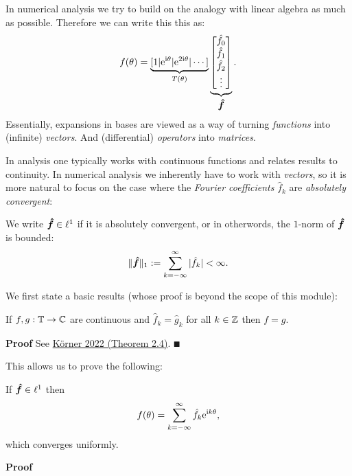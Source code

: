 In numerical analysis we try to build on the analogy with linear algebra as much as possible. Therefore we  can write this this as:
\[
f(\theta) = \underbrace{[1 | {\rm e}^{{\rm i}\theta} | {\rm e}^{2{\rm i}\theta} | \cdots]}_{T(\theta)}
\underbrace{\begin{bmatrix} \hat f_0 \\ \hat f_1 \\ \hat f_2 \\ \vdots \end{bmatrix}}_{{\mbox{\boldmath$\hat f$\unboldmath}}}.
\]
Essentially, expansions in bases are viewed as a way of turning \emph{functions} into (infinite) \emph{vectors}. And (differential) \emph{operators} into \emph{matrices}.

In analysis one typically works with continuous functions and relates results to continuity. In numerical analysis we inherently have to work with \emph{vectors}, so it is more natural to  focus on the case where the \emph{Fourier coefficients} $\hat f_k$ are \emph{absolutely convergent}:

\begin{definition} We write ${\mbox{\boldmath$\hat f$\unboldmath}} \in \ell^1$ if it is absolutely convergent, or in otherwords, the $1$-norm of ${\mbox{\boldmath$\hat f$\unboldmath}}$ is bounded:
\[
\|{\mbox{\boldmath$\hat f$\unboldmath}}\|_1 := \sum_{k=-\infty}^\infty |\hat f_k| < \infty.
\]
\end{definition}

We first state a  basic results (whose proof is beyond the scope of this module):

\begin{theorem} If $f, g : {\mathbb T} \rightarrow {\mathbb C}$ are continuous and $\hat f_k = \hat g_k$ for all $k \in {\mathbb Z}$ then $f = g$.

\end{theorem}
\textbf{Proof} See \href{https://www.cambridge.org/core/books/fourier-analysis/5FD8F0FD69DDB139019655D7F8440D2F}{Körner 2022 (Theorem 2.4)}. \ensuremath{\QED}

This allows us to prove the following:

\begin{theorem} If ${\mbox{\boldmath$\hat f$\unboldmath}} \in \ell^1$ then
\[
f(\theta) = \sum_{k = -\infty}^\infty \hat f_k {\rm e}^{{\rm i} k \theta},
\]
which converges uniformly. \end{theorem}
\textbf{Proof}

